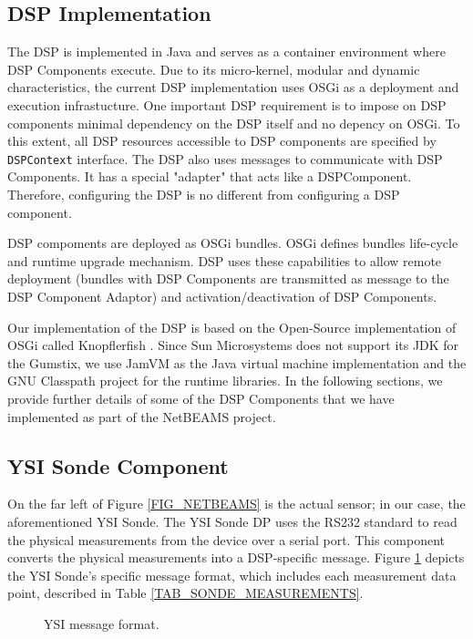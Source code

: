 \documentclass[conference]{IEEEtran}
\begin{document}
\subsection{DSP Implementation}

The DSP is implemented in Java and serves as a container environment where 
DSP Components execute. Due to its micro-kernel, modular and dynamic characteristics, 
the current DSP implementation uses OSGi \cite{osgi} as a deployment and execution 
infrastucture. One important DSP requirement is to impose on DSP components minimal 
dependency on the DSP itself and no depency on OSGi. To this extent, all DSP resources
accessible to DSP components are specified by \texttt{DSPContext} interface.
The DSP also uses messages to communicate with DSP Components. It has a special "adapter"
that acts like a DSPComponent. Therefore, configuring the DSP is no different from configuring
a DSP component.

DSP compoments are deployed as OSGi bundles. OSGi defines bundles life-cycle and
runtime upgrade mechanism. DSP uses these capabilities to allow remote deployment 
(bundles with DSP Components are transmitted as message to the DSP Component Adaptor) 
and activation/deactivation of DSP Components. 

Our implementation of the DSP is based on the Open-Source
implementation of OSGi called Knopflerfish \cite{knopflerfish01}.
Since Sun Microsystems does not support its JDK for the Gumstix, we
use JamVM \cite{jamvm01} as the Java virtual machine implementation
and the GNU Classpath \cite{classpath01} project for the runtime libraries. In
the following sections, we provide further details of some of the DSP
Components that we have implemented as part of the NetBEAMS project.

\subsection{YSI Sonde Component}

On the far left of Figure \ref{FIG_NETBEAMS} is the actual sensor; in
our case, the aforementioned YSI Sonde. The YSI Sonde DP 
uses the RS232 standard to read the physical measurements from the
device over a serial port.  This component converts the physical
measurements into a DSP-specific message. Figure
\ref{FIG_DSP_YSI_DATA} depicts the YSI Sonde's specific message format, 
which includes each measurement data point, described in Table
\ref{TAB_SONDE_MEASUREMENTS}.

\begin{figure}[!htb]
\centering
{}
\caption{\label{FIG_DSP_YSI_DATA} YSI message format.}
\end{figure}
\end{document}
